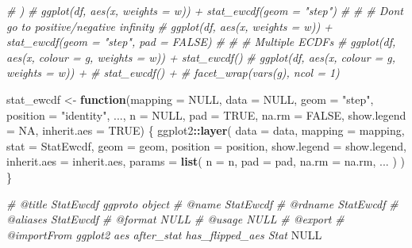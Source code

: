 \documentclass[
]{article}
\newenvironment{Shaded}{\begin{snugshade}}{\end{snugshade}}
\newcommand{\AttributeTok}[1]{\textcolor[rgb]{0.13,0.29,0.53}{#1}}
\newcommand{\CommentTok}[1]{\textcolor[rgb]{0.56,0.35,0.01}{\textit{#1}}}
\newcommand{\ConstantTok}[1]{\textcolor[rgb]{0.56,0.35,0.01}{#1}}
\newcommand{\ControlFlowTok}[1]{\textcolor[rgb]{0.13,0.29,0.53}{\textbf{#1}}}
\newcommand{\FunctionTok}[1]{\textcolor[rgb]{0.13,0.29,0.53}{\textbf{#1}}}
\newcommand{\NormalTok}[1]{#1}
\newcommand{\OtherTok}[1]{\textcolor[rgb]{0.56,0.35,0.01}{#1}}
\newcommand{\SpecialCharTok}[1]{\textcolor[rgb]{0.81,0.36,0.00}{\textbf{#1}}}
\newcommand{\StringTok}[1]{\textcolor[rgb]{0.31,0.60,0.02}{#1}}
\begin{document}
\begin{Shaded}
\begin{Highlighting}[]
\CommentTok{\#\textquotesingle{} )}
\CommentTok{\#\textquotesingle{} ggplot(df, aes(x, weights = w)) + stat\_ewcdf(geom = "step")}
\CommentTok{\#\textquotesingle{}}
\CommentTok{\#\textquotesingle{} \# Don\textquotesingle{}t go to positive/negative infinity}
\CommentTok{\#\textquotesingle{} ggplot(df, aes(x, weights = w)) + stat\_ewcdf(geom = "step", pad = FALSE)}
\CommentTok{\#\textquotesingle{}}
\CommentTok{\#\textquotesingle{} \# Multiple ECDFs}
\CommentTok{\#\textquotesingle{} ggplot(df, aes(x, colour = g, weights = w)) + stat\_ewcdf()}
\CommentTok{\#\textquotesingle{} ggplot(df, aes(x, colour = g, weights = w)) +}
\CommentTok{\#\textquotesingle{}   stat\_ewcdf() +}
\CommentTok{\#\textquotesingle{}   facet\_wrap(vars(g), ncol = 1)}

\NormalTok{stat\_ewcdf }\OtherTok{\textless{}{-}} \ControlFlowTok{function}\NormalTok{(}\AttributeTok{mapping =} \ConstantTok{NULL}\NormalTok{, }\AttributeTok{data =} \ConstantTok{NULL}\NormalTok{,}
                       \AttributeTok{geom =} \StringTok{"step"}\NormalTok{, }\AttributeTok{position =} \StringTok{"identity"}\NormalTok{,}
\NormalTok{                       ...,}
                       \AttributeTok{n =} \ConstantTok{NULL}\NormalTok{,}
                       \AttributeTok{pad =} \ConstantTok{TRUE}\NormalTok{,}
                       \AttributeTok{na.rm =} \ConstantTok{FALSE}\NormalTok{,}
                       \AttributeTok{show.legend =} \ConstantTok{NA}\NormalTok{,}
                       \AttributeTok{inherit.aes =} \ConstantTok{TRUE}\NormalTok{) \{}
\NormalTok{  ggplot2}\SpecialCharTok{::}\FunctionTok{layer}\NormalTok{(}
    \AttributeTok{data =}\NormalTok{ data,}
    \AttributeTok{mapping =}\NormalTok{ mapping,}
    \AttributeTok{stat =}\NormalTok{ StatEwcdf,}
    \AttributeTok{geom =}\NormalTok{ geom,}
    \AttributeTok{position =}\NormalTok{ position,}
    \AttributeTok{show.legend =}\NormalTok{ show.legend,}
    \AttributeTok{inherit.aes =}\NormalTok{ inherit.aes,}
    \AttributeTok{params =} \FunctionTok{list}\NormalTok{(}
      \AttributeTok{n =}\NormalTok{ n,}
      \AttributeTok{pad =}\NormalTok{ pad,}
      \AttributeTok{na.rm =}\NormalTok{ na.rm,}
\NormalTok{      ...}
\NormalTok{    )}
\NormalTok{  )}
\NormalTok{\}}


\CommentTok{\#\textquotesingle{} @title StatEwcdf ggproto object}
\CommentTok{\#\textquotesingle{} @name StatEwcdf}
\CommentTok{\#\textquotesingle{} @rdname StatEwcdf}
\CommentTok{\#\textquotesingle{} @aliases StatEwcdf}
\CommentTok{\#\textquotesingle{} @format NULL}
\CommentTok{\#\textquotesingle{} @usage NULL}
\CommentTok{\#\textquotesingle{} @export}
\CommentTok{\#\textquotesingle{} @importFrom ggplot2 aes after\_stat has\_flipped\_aes Stat}
\ConstantTok{NULL}


\end{Highlighting}
\end{Shaded}
\end{document}
